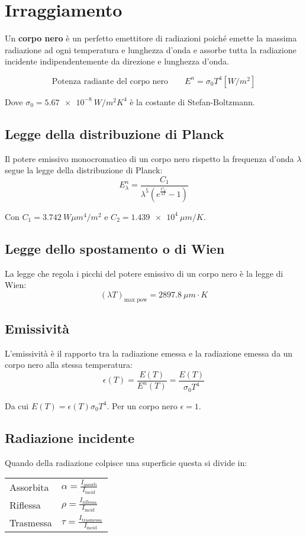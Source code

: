 \section{Irraggiamento}

Un \textbf{corpo nero} è un perfetto emettitore di radiazioni poiché emette la massima radiazione ad ogni temperatura e lunghezza d'onda e assorbe tutta la radiazione incidente indipendentemente da direzione e lunghezza d'onda.

\[
    \text{Potenza radiante del corpo nero} \qquad E^n = \sigma_0 T^4 [W/m^2]
\]

Dove $\sigma_0 = \SI{5.67e-8}{W/m^2K^4}$ è la costante di Stefan-Boltzmann.

\subsection{Legge della distribuzione di Planck}
Il potere emissivo monocromatico di un corpo nero rispetto la frequenza d'onda $\lambda$ segue la legge della distribuzione di Planck:
\[
    E^n_\lambda = \frac{C_1}{\lambda^5 (e^{\frac{C_2}{\lambda T}} - 1) }
\]

Con $C_1 = \SI{3.742}{W \mu m^4/m^2}$ e $C_2 = \SI{1.439e4}{\mu m / K}$.

\subsection{Legge dello spostamento o di Wien}
La legge che regola i picchi del potere emissivo di un corpo nero è la legge di Wien:
\[
    (\lambda T)_{\text{max pow}} = \SI{2897.8}{\mu m\cdot K}
\]

\subsection{Emissività}
L'emissività è il rapporto tra la radiazione emessa e la radiazione emessa da un corpo nero alla stessa temperatura:
\[
    \epsilon(T) = \frac{E(T)}{E^n(T)} = \frac{E(T)}{\sigma_0T^4}
\]

Da cui $E(T) = \epsilon(T)\sigma_0T^4$. Per un corpo nero $\epsilon = 1$.

\subsection{Radiazione incidente}
Quando della radiazione colpisce una superficie questa si divide in:

\begin{tabular}{ll}
    Assorbita & $\alpha = \frac{I_\text{assorb}}{I_\text{incid}}$ \\
    Riflessa & $\rho = \frac{I_\text{riflessa}}{I_\text{incid}}$ \\
    Trasmessa & $\tau = \frac{I_\text{trasmessa}}{I_\text{incid}}$ \\
\end{tabular}

